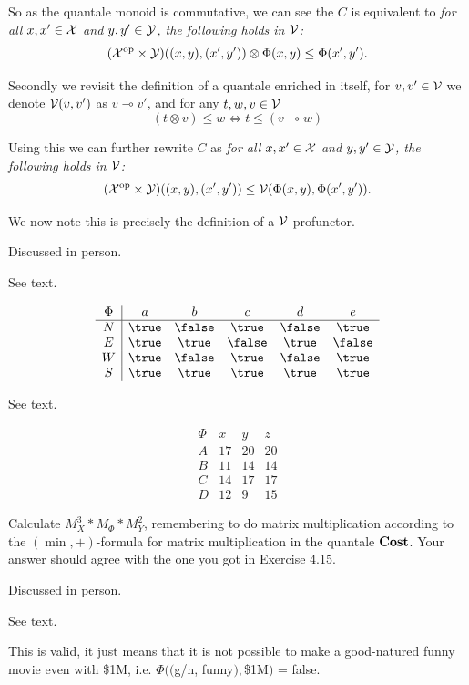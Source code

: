 So as the quantale monoid is commutative, we can see the $C$ is equivalent to \textit{for all $x,x'\in\mathcal{X}$ and $y,y'\in\mathcal{Y}$, the following holds in $\mathcal{V}$:}
$$(\mathcal{X}^{\textrm{op}}\times\mathcal{Y})((x,y),(x',y'))\otimes\Phi(x,y)\leq\Phi(x',y').$$

Secondly we revisit the definition of a quantale enriched in itself, for $v,v'\in \mathcal{V}$ we denote $\mathcal{V}(v,v')$ as  $v\multimap v'$, and for any $t,w,v\in \mathcal{V}$
 $$(t\otimes v)\leq w \iff t\leq (v\multimap w)$$
 
Using this we can further rewrite $C$ as \textit{for all $x,x'\in\mathcal{X}$ and $y,y'\in\mathcal{Y}$, the following holds in $\mathcal{V}$:}
$$(\mathcal{X}^{\textrm{op}}\times\mathcal{Y})((x,y),(x',y'))\leq\mathcal{V}(\Phi(x,y),\Phi(x',y')).$$

We now note this is precisely the definition of a $\mathcal{V}$-profunctor.

Discussed in person.

See text.

\solution
$$\begin{array}{c|ccccc}
\Phi & a & b & c & d & e \\
\hline N & \true & \false & \true & \false & \true \\
E & \true & \true & \false & \true & \false \\
W & \true & \false & \true & \false & \true \\
S & \true & \true & \true & \true & \true
\end{array}$$

See text.

\solution
$$\begin{array}{c|ccc}
\Phi & x & y & z \\
\hline A & 17 & 20 & 20 \\
B & 11 & 14 & 14 \\
C & 14 & 17 & 17 \\
D & 12 & 9 & 15
\end{array}$$

Calculate $M_X^3*M_\Phi*M_Y^2$, remembering to do matrix multiplication according to the $(\min,+)$-formula for matrix multiplication in the quantale $\textbf{Cost}$.  Your answer should agree with the one you got in Exercise 4.15.

\solution
Discussed in person.

See text.

\solution
This is valid, it just means that it is not possible to make a good-natured funny movie even with \$1M, i.e. $\Phi(($g/n, funny$), $\$1M$)$ = false.

